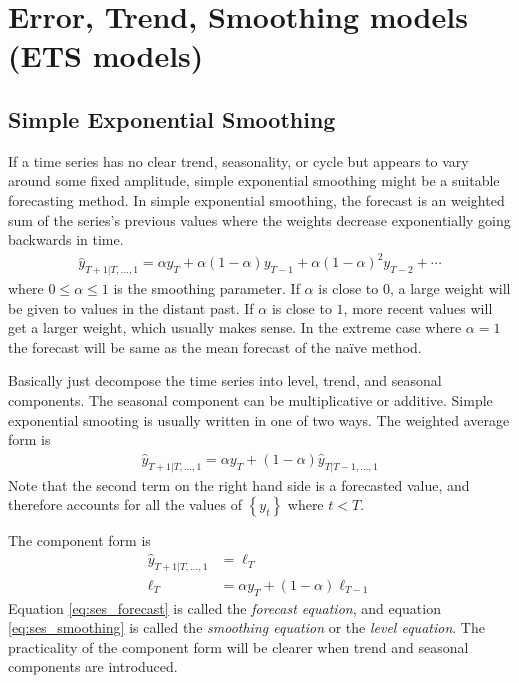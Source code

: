 \documentclass[a4paper,12pt]{article}
\theoremstyle{definition}
\begin{document}
\section{Error, Trend, Smoothing models (ETS models)}
\subsection{Simple Exponential Smoothing}
If a time series has no clear trend, seasonality, or cycle but appears to vary around some fixed amplitude, simple exponential smoothing might be a suitable forecasting method. In simple exponential smoothing, the forecast is an weighted sum of the series's previous values where the weights decrease exponentially going backwards in time.
\begin{align}
	\hat{y}_{T+1 | T,\dots,1} = \alpha y_T + \alpha(1-\alpha)y_{T-1} + \alpha(1-\alpha)^2y_{T-2} + \cdots
\end{align}
where $0 \leq \alpha \leq 1$ is the smoothing parameter. If $\alpha$ is close to $0$, a large weight will be given to values in the distant past. If $\alpha$ is close to $1$, more recent values will get a larger weight, which usually makes sense. In the extreme case where $\alpha = 1$ the forecast will be same as the mean forecast of the na\"{i}ve method.

Basically just decompose the time series into level, trend, and seasonal components. The seasonal component can be multiplicative or additive. Simple exponential smooting is usually written in one of two ways. The weighted average form is
\begin{align}
	\hat{y}_{T+1|T,\dots,1} = \alpha y_T + \left(  1 - \alpha \right)\hat{y}_{T|T-1,\dots,1}
\end{align}
Note that the second term on the right hand side is a forecasted value, and therefore accounts for all the values of $\left\{ y_t \right\}$ where $t < T$.

The component form is
\begin{align}
	\hat{y}_{T+1|T,\dots,1} &= \ell_T \label{eq:ses_forecast}\\
	\ell_T &= \alpha y_T	+ (1 - \alpha)\ell_{T-1} \label{eq:ses_smoothing}
\end{align}
Equation \ref{eq:ses_forecast} is called the \textit{forecast equation}, and equation \ref{eq:ses_smoothing} is called the \textit{smoothing equation} or the \textit{level equation}. The practicality of the component form will be clearer when trend and seasonal components are introduced.
\end{document}
